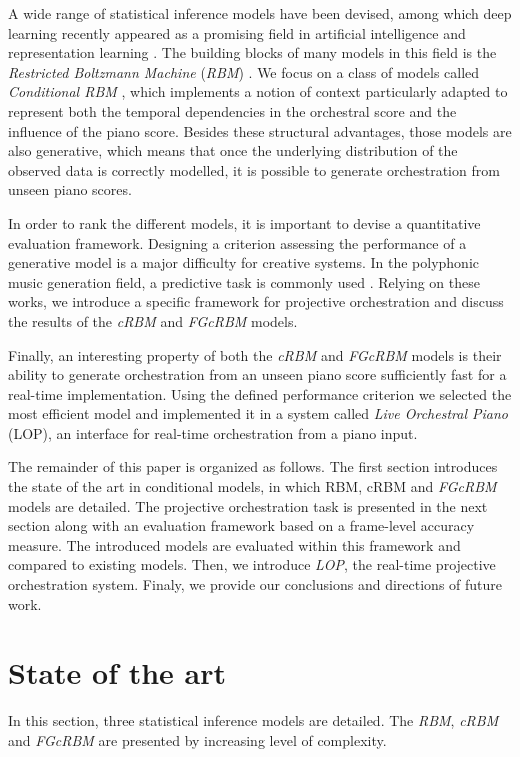 \documentclass[letterpaper]{article}
\begin{document}
A wide range of statistical inference models have been devised, among which deep learning recently appeared as a  promising field in artificial intelligence and representation learning \cite{bengio2013representation,LeCun:2015aa}. The building blocks of many models in this field is the \textit{Restricted Boltzmann Machine} (\textit{RBM}) \cite{hinton2006fast}.
We focus on a class of models called \textit{Conditional RBM} \cite{taylor2006modeling}, which implements a notion of context particularly adapted to represent both the temporal dependencies in the orchestral score and the influence of the piano score.
Besides these structural advantages, those models are also generative, which means that once the underlying distribution of the observed data is correctly modelled, it is possible to generate orchestration from unseen piano scores.

In order to rank the different models, it is important to devise a quantitative evaluation framework. Designing a criterion assessing the performance of a generative model is a major difficulty for creative systems. In the polyphonic music generation field, a predictive task is commonly used \cite{DBLP:journals/corr/YaoCVDD15,boulanger2012modeling,lavrenko2003polyphonic}. Relying on these works, we introduce a specific framework for projective orchestration and discuss the results of the \textit{cRBM} and \textit{FGcRBM} models.

Finally, an interesting property of both the \textit{cRBM} and \textit{FGcRBM} models is their ability to generate orchestration from an unseen piano score sufficiently fast for a real-time implementation.
Using the defined performance criterion we selected the most efficient model and implemented it in a system called \textit{Live Orchestral Piano} (LOP), an interface for real-time orchestration from a piano input.

The remainder of this paper is organized as follows. The first section introduces the state of the art in conditional models, in which RBM, cRBM and \textit{FGcRBM} models are detailed. The projective orchestration task is presented in the next section along with an evaluation framework based on a frame-level accuracy measure. The introduced models are evaluated within this framework and compared to existing models. Then, we introduce \textit{LOP}, the real-time projective orchestration system. Finaly, we provide our conclusions and directions of future work.

\section{State of the art}
In this section, three statistical inference models are detailed. The \textit{RBM}, \textit{cRBM} and \textit{FGcRBM} are presented by increasing level of complexity.
\end{document}
